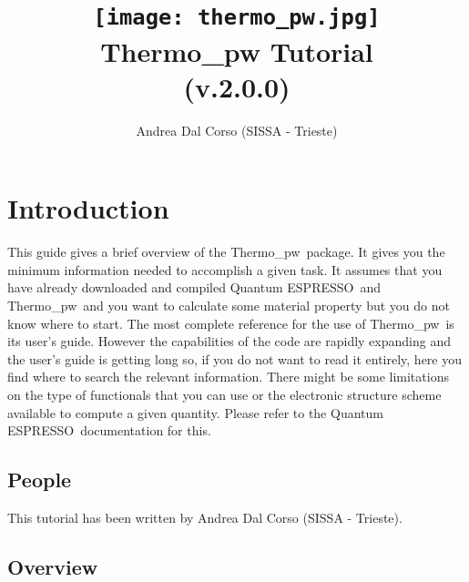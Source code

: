 \documentclass[12pt,a4paper,twoside]{report}
\def\version{2.0.0}
\def\qe{{\sc Quantum ESPRESSO}}
\def\thermo{{\sc Thermo}\_{\sc pw}}
\begin{document}
 

\author{Andrea Dal Corso (SISSA - Trieste)}
\date{}

\title{
  \texttt{[image: thermo\_pw.jpg]} \\
  \vspace{3truecm}
  \Huge \color{dark-blue} {\sc Thermo}\_{\sc pw} Tutorial \\ (v.\version)
}

\maketitle

\newpage

\tableofcontents

\newpage

{\color{dark-blue}\chapter*{Introduction}}
\color{black}

This guide gives a brief overview of the \thermo\ package. 
It gives you the minimum information needed to accomplish a given task.
It assumes that you have already downloaded and compiled \qe\ and \thermo\  
and you want to calculate some material property but you do not know where 
to start. 
The most complete reference for the use of \thermo\ is its user's guide.
However the capabilities of the code are rapidly expanding and the 
user's guide is getting long so, if you do not want
to read it entirely, here you find where to search the relevant information. 
There might be some limitations on the type of functionals that you can use 
or the electronic structure scheme available to compute a given quantity.
Please refer to the \qe\ documentation for this.

\newpage

{\color{coral}\section{People}}
\color{black}
This tutorial has been written by Andrea Dal Corso (SISSA - Trieste). 

\newpage

{\color{coral}\section{Overview}}
\color{black}
\end{document}
